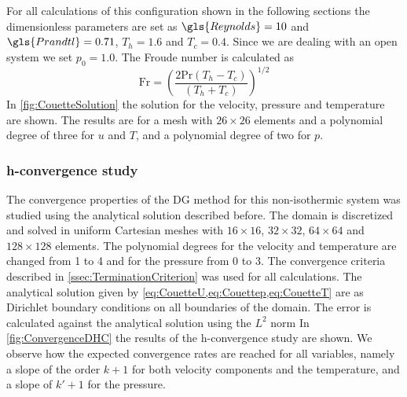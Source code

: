 \FloatBarrier
For all calculations of this configuration shown in the following sections the dimensionless parameters are set as $\gls{Reynolds} = 10$ and $\gls{Prandtl} =0.71$, $T_h = 1.6$ and $T_c = 0.4$. Since we are dealing with an open system we set $p_0 =1.0$. The Froude number is calculated as 
\begin{equation}
\text{Fr} = \left( \frac{2\text{Pr}(T_h-T_c)}{(T_h+T_c)}\right)^{1/2}
\end{equation}
In \cref{fig:CouetteSolution} the solution for the velocity, pressure and temperature are shown. The results are for a mesh with $26\times26$ elements and a polynomial degree of three for $u$ and $T$, and a polynomial degree of two for $p$.


\subsubsection{h-convergence study}

The convergence properties of the DG method for this non-isothermic system was studied using the analytical solution described before. The domain is discretized and solved in uniform Cartesian meshes with $16\times16$, $32\times32$, $64\times64$ and $128\times128$ elements. The polynomial degrees for the velocity and temperature are changed from 1 to 4 and for the pressure from 0 to 3. The convergence criteria described in \cref{ssec:TerminationCriterion} was used for all calculations. The  analytical solution given by \cref{eq:CouetteU,eq:Couettep,eq:CouetteT} are as Dirichlet boundary conditions on all boundaries of the domain. The error is calculated against the analytical solution using the $L^2$ norm %
In \cref{fig:ConvergenceDHC} the results of the h-convergence study are shown. We observe how the expected convergence rates are reached for all variables, namely a slope of the order $k+1$ for both velocity components and the temperature, and a slope of $k'+1$ for the pressure.

%


